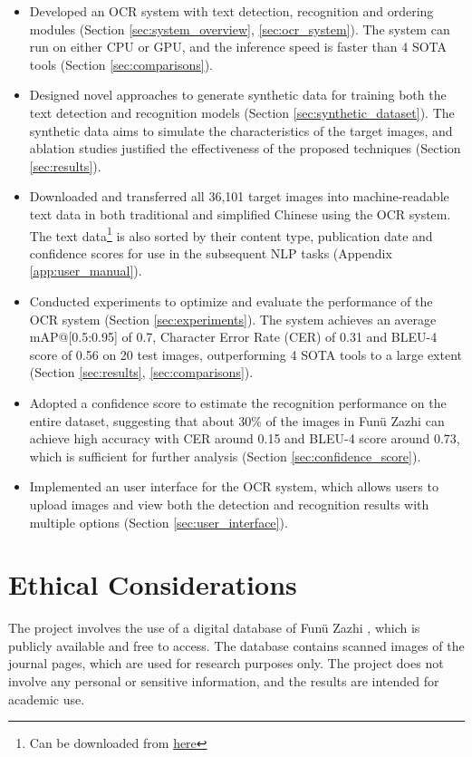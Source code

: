 \documentclass[12pt,twoside]{report}
\begin{document}
\begin{itemize}
    \item Developed an OCR system with text detection, recognition and ordering modules (Section \ref{sec:system_overview}, \ref{sec:ocr_system}). The system can run on either CPU or GPU, and the inference speed is faster than 4 SOTA tools (Section \ref{sec:comparisons}).
    \item Designed novel approaches to generate synthetic data for training both the text detection and recognition models (Section \ref{sec:synthetic_dataset}). The synthetic data aims to simulate the characteristics of the target images, and ablation studies justified the effectiveness of the proposed techniques (Section \ref{sec:results}).
    \item Downloaded and transferred all 36,101 target images \cite{fnzzpages} into machine-readable text data in both traditional and simplified Chinese using the OCR system. The text data\footnote{Can be downloaded from \href{https://drive.google.com/file/d/1ZQlRNj_RFLCKoeZTp0lKHTEiu9-u5WsU/view?usp=share_link}{here}} is also sorted by their content type, publication date and confidence scores for use in the subsequent NLP tasks (Appendix \ref{app:user_manual}).
    \item Conducted experiments to optimize and evaluate the performance of the OCR system (Section \ref{sec:experiments}). The system achieves an average mAP@[0.5:0.95] of 0.7, Character Error Rate (CER) of 0.31 and BLEU-4 score of 0.56 on 20 test images, outperforming 4 SOTA tools to a large extent (Section \ref{sec:results}, \ref{sec:comparisons}).
    \item Adopted a confidence score to estimate the recognition performance on the entire dataset, suggesting that about 30\% of the images in Funü Zazhi \cite{fnzz} can achieve high accuracy with CER around 0.15 and BLEU-4 score around 0.73, which is sufficient for further analysis (Section \ref{sec:confidence_score}).
    \item Implemented an user interface for the OCR system, which allows users to upload images and view both the detection and recognition results with multiple options (Section \ref{sec:user_interface}).
\end{itemize}

\section{Ethical Considerations}
The project involves the use of a digital database of Funü Zazhi \cite{fnzz}, which is publicly available and free to access. The database contains scanned images of the journal pages, which are used for research purposes only. The project does not involve any personal or sensitive information, and the results are intended for academic use.
\end{document}
